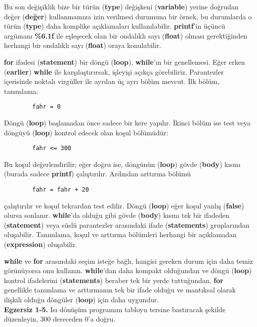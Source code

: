 \documentclass[a4paper,12pt,oneside]{book}
\begin{document}
\par Bu son değişiklik bize bir türün (\textbf{type}) değişkeni (\textbf{variable}) yerine doğrudan değer (\textbf{değer}) kullanmamıza izin verilmesi durumuna bir örnek, bu durumlarda o türün (\textbf{type}) daha komplike açıklamaları kullanılabilir. \textbf{printf}'in üçüncü argümanı \textbf{\%6.1f} ile eşleşecek olan bir ondalıklı sayı (\textbf{float}) olması gerektiğinden herhangi bir ondalıklı sayı (\textbf{float}) oraya konulabilir.
\par \textbf{for} ifadesi (\textbf{statement}) bir döngü (\textbf{loop}), \textbf{while}'ın bir genellemesi. Eğer erken (\textbf{earlier}) \textbf{while} ile karşılaştırırsak, işleyişi açıkça görebiliriz. Parantezler içerisinde noktalı virgüller ile ayrılan üç ayrı bölüm mevcut. İlk bölüm, tanımlama:
\begin{lstlisting}
		fahr = 0
\end{lstlisting}
Döngü (\textbf{loop}) başlamadan önce sadece bir kere yapılır. İkinci bölüm ise test veya döngüyü (\textbf{loop}) kontrol edecek olan koşul bölümüdür:
\begin{lstlisting}
		fahr <= 300
\end{lstlisting}
Bu koşul değerlendirilir; eğer doğru ise, döngünün (\textbf{loop}) gövde (\textbf{body}) kısmı (burada sadece \textbf{printf}) çalıştırılır. Ardından arttırma bölümü
\begin{lstlisting}
		fahr = fahr + 20
\end{lstlisting}
çalıştırılır ve koşul tekrardan test edilir. Döngü (\textbf{loop}) eğer koşul yanlış (\textbf{false}) olursa sonlanır. \textbf{while}'da olduğu gibi gövde (\textbf{body}) kısmı tek bir ifadeden (\textbf{statement}) veya süslü parantezler arasındaki ifade (\textbf{statements}) gruplarından oluşabilir. Tanımlama, koşul ve arttırma bölümleri herhangi bir açıklamadan (\textbf{expression}) oluşabilir.
\par \textbf{while} ve \textbf{for} arasındaki seçim isteğe bağlı, hangisi gereken durum için daha temiz görünüyorsa onu kullanın. \textbf{while}'dan daha kompakt olduğundan ve döngü (\textbf{loop}) kontrol ifadelerini (\textbf{statements}) beraber tek bir yerde tuttuğundan, \textbf{for} genellikle tanımlama ve arttırmanın tek bir ifade olduğu ve mantıksal olarak ilişkili olduğu döngüler (\textbf{loop}) için daha uygundur. \newline
\\ \textbf{Egzersiz 1-5.} Isı dönüşüm programını tabloyu tersine bastıracak şekilde düzenleyin, 300 dereceden 0'a doğru. \pagebreak
\end{document}

